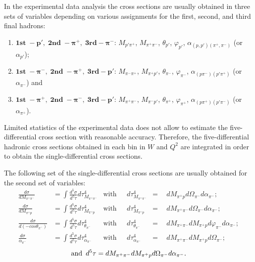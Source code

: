In the experimental data analysis the cross sections are usually obtained in three sets of variables depending on various assignments for the first, second, and third final hadrons:

\begin{enumerate}
\item $\boldsymbol{1st\; - p',\; 2nd \; - \pi^{+},\;3rd - \pi^{-}}$: $M_{p'\pi^{+}}$, $M_{\pi^{+}\pi^{-}}$, $\theta_{p'}$, $\varphi_{p'}$, $\alpha_{(p,p')(\pi^{+},\pi^{-})}$ (or $\alpha_{p'}$);
\item $\boldsymbol{1st\; - \pi^{-},\; 2nd \; - \pi^{+},\;3rd - p'}$: $M_{\pi^{-}\pi^{+}}$, $M_{\pi^{+}p'}$, $\theta_{\pi^{-}}$, $\varphi_{\pi^{-}}$, $\alpha_{(p\pi^{-})(p'\pi^{+})}$ (or $\alpha_{\pi^{-}}$) and
\item $\boldsymbol{1st\; - \pi^{+},\; 2nd \; - \pi^{-},\;3rd - p'}$: $M_{\pi^{+}\pi^{-}}$, $M_{\pi^{-}p'}$, $\theta_{\pi^{+}}$, $\varphi_{\pi^{+}}$, $\alpha_{(p\pi^{+})(p'\pi^{-})}$ (or $\alpha_{\pi^{+}}$).
\end{enumerate}

Limited statistics of the experimental data does not allow to estimate the five-differential cross section with reasonable accuracy. Therefore, the five-differential hadronic cross sections obtained in each bin in $W$ and $Q^2$ are integrated in order to obtain the single-differential cross sections.


The following set of the single-differential cross sections are usually obtained for the second set of variables:
\begin{equation}
\begin{aligned}
\frac{d\sigma}{dM_{\pi^{+}\pi^{-}}} & =
\int\frac{d^{5}\sigma}{d^{5}\tau}d\tau_{M_{\pi^{+}\pi^{-}}}^{4} & \textrm{with}~~~& 
 d\tau_{M_{\pi^{+}\pi^{-}}}^{4} &\!\!\!\!\! =~~ &
dM_{\pi^{+}p}d\Omega_{\pi^{-}}d\alpha_{\pi^{-}}; \\
\frac{d\sigma}{dM_{\pi^{+}p}} & =
\int\frac{d^{5}\sigma}{d^{5}\tau}d\tau_{M_{\pi^{+}p}}^{4}  & \textrm{with}~~~& 
d\tau_{M_{\pi^{+}p}}^{4} &\!\!\!\!\! =~~ &
dM_{\pi^{+}\pi^{-}}d\Omega_{\pi^{-}}d\alpha_{\pi^{-}}; \\
\frac{d\sigma}{d(-cos\theta_{\pi^{-}})} & =
\int\frac{d^{5}\sigma}{d^{5}\tau}d\tau_{\theta_{\pi^{-}}}^{4} & \textrm{with}~~~& 
d\tau_{\theta_{\pi^{-}}}^{4} &\!\!\!\!\! =~~ &
dM_{\pi^{+}\pi^{-}}dM_{\pi^{+}p}d\varphi_{\pi^{-}}d\alpha_{\pi^{-}}; \\
\frac{d\sigma}{\alpha_{\pi^{-}}} & =
\int\frac{d^{5}\sigma}{d^{5}\tau}d\tau_{\alpha_{\pi^{-}}}^{4} & \textrm{with}~~~& 
d\tau_{\alpha_{\pi^{-}}}^{4} &\!\!\!\!\! =~~ &
dM_{\pi^{+}\pi^{-}}dM_{\pi^{+}p}d\Omega_{\pi^{-}};
\end{aligned}
\label{inegr5diff}
\end{equation}
$$
\text{and\,\,\,} d^{5}\tau = dM_{\pi^{+}\pi^{-}}dM_{\pi^{+}p}d\Omega_{\pi^{-}}d\alpha_{\pi^{-}}. 
$$

